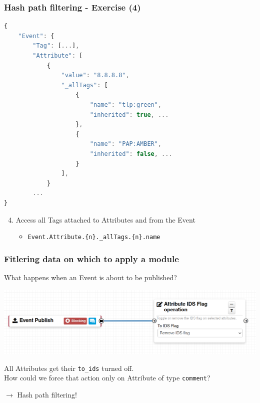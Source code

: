 \begin{frame}[fragile]
    \frametitle{Hash path filtering - Exercise (4)}

\begin{lstlisting}[language=javascript,firstnumber=1]
{
    "Event": {
        "Tag": [...],
        "Attribute": [
            {
                "value": "8.8.8.8",
                "_allTags": [
                    {
                        "name": "tlp:green",
                        "inherited": true, ...
                    },
                    {
                        "name": "PAP:AMBER",
                        "inherited": false, ...
                    }
                ],
            }
        ...
}
\end{lstlisting}
    \begin{enumerate}
        \setcounter{enumi}{3}
        \item Access all Tags attached to Attributes and from the Event
        \begin{itemize}
            \item \texttt{Event.Attribute.\{n\}.\_allTags.\{n\}.name}
        \end{itemize}
    \end{enumerate}
\end{frame}


\begin{frame}
    \frametitle{Fitlering data on which to apply a module}
    What happens when an Event is about to be published?
    \begin{center}
        \includegraphics[width=1.0\textwidth]{pictures/remove-ids-1.png}
    \end{center}
    \pause
    \vspace{1em}
    All Attributes get their \texttt{to\_ids} turned off.\\
    \vspace{1em}
    How could we force that action only on Attribute of type \texttt{comment}?
    \begin{center}
        $\rightarrow$ Hash path filtering!
    \end{center}
\end{frame}

